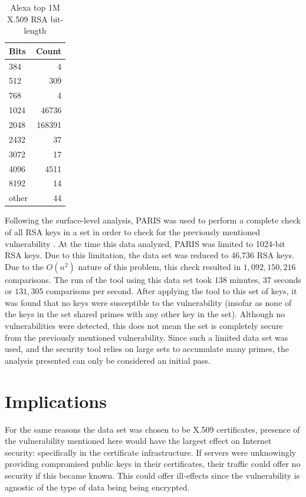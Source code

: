\documentclass[12pt]{ucthesis}
\begin{document}
\begin{table}
\centering
\caption{Alexa top 1M X.509 RSA bit-length\label{tab:bits}}
\begin{tabular}{|l|r|}\hline
\textbf{Bits} & \textbf{Count}\\\hline
384 & 4 \\ \hline
512 & 309 \\ \hline
768 & 4 \\ \hline
1024 & 46736 \\ \hline
2048 & 168391 \\ \hline
2432 & 37 \\ \hline
3072 & 17 \\ \hline
4096 & 4511 \\ \hline
8192 & 14 \\ \hline
other & 44 \\ \hline
\end{tabular}
\end{table}

Following the surface-level analysis, PARIS was used to perform a complete
check of all RSA keys in a set in order to check for the previously mentioned
vulnerability \citep{lenstra2012ron}. At the time this data analyzed, PARIS was
limited to 1024-bit RSA keys. Due to this limitation, the data set was reduced
to 46,736 RSA keys. Due to the $O(n^2)$ nature of this problem, this check
resulted in $1,092,150,216$ comparisons. The run of the tool using this data
set took 138 minutes, 37 seconds or $131,305$ comparisons per second.  After
applying the tool to this set of keys, it was found that no keys were
susceptible to the vulnerability (insofar as none of the keys in the set shared
primes with any other key in the set). Although no vulnerabilities were
detected, this does not mean the set is completely secure from the previously
mentioned vulnerability. Since such a limited data set was used, and the
security tool relies on large sets to accumulate many primes, the analysis
presented can only be considered an initial pass.  

\section{Implications}
\label{subsec:implications}
For the same reasons the data set was chosen to be X.509 certificates, presence
of the vulnerability mentioned here would have the largest effect on Internet
security: specifically in the certificate infrastructure. If servers were
unknowingly providing compromised public keys in their certificates, their
traffic could offer no security if this became known. This could offer
ill-effects since the vulnerability is agnostic of the type of data being
being encrypted.
\end{document}
